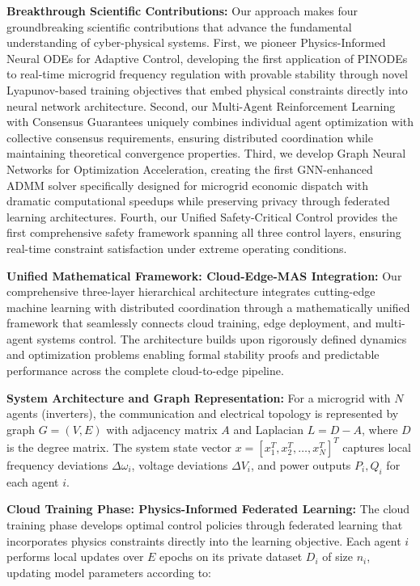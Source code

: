 \documentclass[12pt]{article}
\begin{document}
\textbf{Breakthrough Scientific Contributions:} Our approach makes four groundbreaking scientific contributions that advance the fundamental understanding of cyber-physical systems. First, we pioneer Physics-Informed Neural ODEs for Adaptive Control, developing the first application of PINODEs to real-time microgrid frequency regulation with provable stability through novel Lyapunov-based training objectives that embed physical constraints directly into neural network architecture. Second, our Multi-Agent Reinforcement Learning with Consensus Guarantees uniquely combines individual agent optimization with collective consensus requirements, ensuring distributed coordination while maintaining theoretical convergence properties. Third, we develop Graph Neural Networks for Optimization Acceleration, creating the first GNN-enhanced ADMM solver specifically designed for microgrid economic dispatch with dramatic computational speedups while preserving privacy through federated learning architectures. Fourth, our Unified Safety-Critical Control provides the first comprehensive safety framework spanning all three control layers, ensuring real-time constraint satisfaction under extreme operating conditions.

\textbf{Unified Mathematical Framework: Cloud-Edge-MAS Integration:} Our comprehensive three-layer hierarchical architecture integrates cutting-edge machine learning with distributed coordination through a mathematically unified framework that seamlessly connects cloud training, edge deployment, and multi-agent systems control. The architecture builds upon rigorously defined dynamics and optimization problems enabling formal stability proofs and predictable performance across the complete cloud-to-edge pipeline.

\textbf{System Architecture and Graph Representation:} For a microgrid with $N$ agents (inverters), the communication and electrical topology is represented by graph $G = (V, E)$ with adjacency matrix $A$ and Laplacian $L = D - A$, where $D$ is the degree matrix. The system state vector $x = [x_1^T, x_2^T, \ldots, x_N^T]^T$ captures local frequency deviations $\Delta\omega_i$, voltage deviations $\Delta V_i$, and power outputs $P_i, Q_i$ for each agent $i$.

\textbf{Cloud Training Phase: Physics-Informed Federated Learning:} The cloud training phase develops optimal control policies through federated learning that incorporates physics constraints directly into the learning objective. Each agent $i$ performs local updates over $E$ epochs on its private dataset $D_i$ of size $n_i$, updating model parameters according to:
\end{document}
